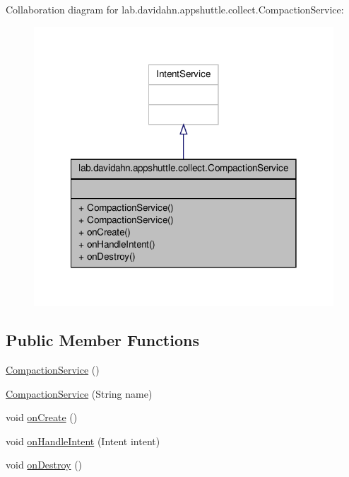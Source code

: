 \-Collaboration diagram for lab.\-davidahn.\-appshuttle.\-collect.\-Compaction\-Service\-:
\nopagebreak
\begin{figure}[H]
\begin{center}
\leavevmode
\includegraphics[width=318pt]{classlab_1_1davidahn_1_1appshuttle_1_1collect_1_1_compaction_service__coll__graph}
\end{center}
\end{figure}
\subsection*{\-Public \-Member \-Functions}
\begin{DoxyCompactItemize}
\item 
\hyperlink{classlab_1_1davidahn_1_1appshuttle_1_1collect_1_1_compaction_service_a1c56a2b6692d2f27d48728020dfbe1cb}{\-Compaction\-Service} ()
\item 
\hyperlink{classlab_1_1davidahn_1_1appshuttle_1_1collect_1_1_compaction_service_aeb132604123bd6e2a0e28484d72b6e1b}{\-Compaction\-Service} (\-String name)
\item 
void \hyperlink{classlab_1_1davidahn_1_1appshuttle_1_1collect_1_1_compaction_service_a20d1a4d5863d6909bf78ef4299b8b743}{on\-Create} ()
\item 
void \hyperlink{classlab_1_1davidahn_1_1appshuttle_1_1collect_1_1_compaction_service_a471a78969a7c1bda85eb0be26ec22dc4}{on\-Handle\-Intent} (\-Intent intent)
\item 
void \hyperlink{classlab_1_1davidahn_1_1appshuttle_1_1collect_1_1_compaction_service_a484c87d3e73c77c19f6166096a2784bc}{on\-Destroy} ()
\end{DoxyCompactItemize}


